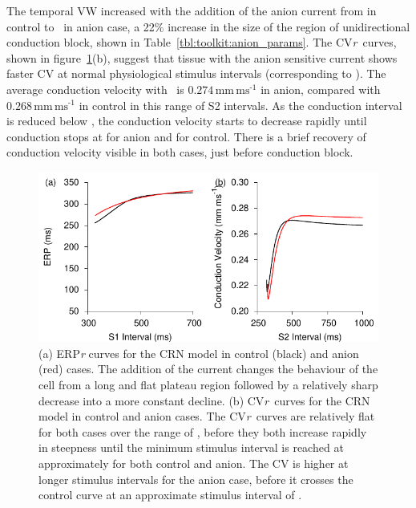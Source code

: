The temporal VW increased with the addition of the anion current from 
in control to \ in anion case, a 22\% increase in the size of the
region of unidirectional conduction block, shown in
Table~\ref{tbl:toolkit:anion_params}.
The CV\emph{r}\ curves, shown in
figure~\ref{fig:toolkit:anion:erpr}(b), suggest that tissue with the anion sensitive current
shows faster CV at normal physiological stimulus intervals (corresponding to
).
The average conduction velocity with \ is
$0.274\,\text{mm}\,\text{ms}^{\text{-1}}$ in anion,
compared with $0.268\,\text{mm}\,\text{ms}^{\text{-1}}$ in control in this range
of S2 intervals.
As the conduction interval is reduced below , the conduction velocity
starts to decrease rapidly until conduction stops at  for anion and
 for control.
There is a brief recovery of conduction velocity visible in both cases, just
before conduction block.

\begin{figure}
\begin{center}
\includegraphics{figures/toolkit/anion/figures/03_ERPR}
\end{center}
\caption[Anion Current ERPr and CVr] {
\label{fig:toolkit:anion:erpr}
(a)
ERP\emph{r} curves for the CRN model in control (black) and anion
(red) cases.
The addition of the  current changes the behaviour of the cell from a long
and flat plateau region followed by a relatively sharp decrease into a more
constant decline.
(b)
CV\emph{r}\ curves for the CRN model in control and anion cases.
 The CV\emph{r}\ curves are relatively flat for both cases over the range of
, before they both increase rapidly in steepness until the minimum
stimulus interval is reached at approximately  for both control and anion.
The CV is higher at longer stimulus intervals for the anion case, before it
crosses the control curve at an approximate stimulus interval of .
}
\end{figure}


